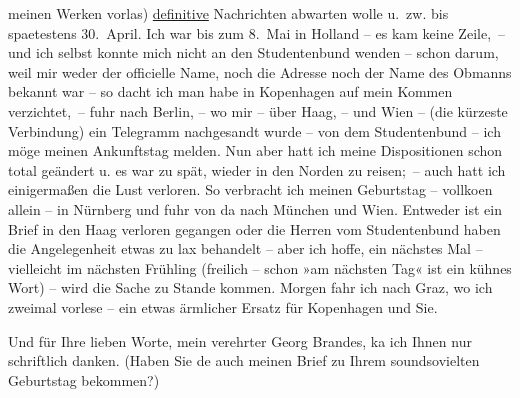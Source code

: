                meinen Werken vorlas) \uline{definitive}{ } Nachrichten abwarten wolle u. zw. bis spaetestens
                  30. April. Ich war bis zum 8. Mai in Holland – es kam keine Zeile, – und ich selbst konnte mich nicht
               an den Studentenbund wenden – schon darum, weil mir weder der officielle Name, noch
               die Adresse noch der Name des Obmanns {\pb}bekannt war
               – so dacht ich man habe in Kopenhagen auf mein
               Kommen verzichtet, – fuhr nach Berlin, – wo mir –
               über Haag, – und Wien – (die kürzeste Verbindung) ein Telegramm nachgesandt wurde – von dem
               Studentenbund – ich möge meinen Ankunftstag melden. Nun aber hatt ich meine
               Dispositionen schon total geändert u. es war zu spät, wieder in den Norden zu
               reisen; – auch hatt ich einigermaßen die Lust verloren. So verbracht ich meinen
               Geburtstag – vollko{\geminationm}en allein – in Nürnberg und fuhr von da nach München und Wien. Entweder ist ein Brief
               in den Haag verloren gegangen oder die Herren
               vom Studentenbund haben die Angelegenheit etwas zu lax behandelt – aber ich hoffe,
               ein nächstes Mal – vielleicht im nächsten Frühling (freilich – schon »am nächsten
               Tag« ist ein kühnes Wort) – wird die Sache zu Stande kommen. {\pb}Morgen fahr ich nach Graz, wo ich zweimal vorlese – ein etwas ärmlicher Ersatz für
                  Kopenhagen und Sie.\pend
           
\pstart
           Und für Ihre lieben Worte, mein verehrter Georg Brandes, ka{\geminationn} ich Ihnen nur schriftlich danken. (Haben Sie de{\geminationn} auch meinen Brief zu Ihrem soundsovielten Geburtstag
               bekommen?)\pend
           
